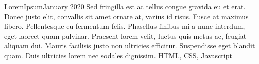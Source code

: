 
\begin{projects}
	\project
	{LoremIpsum}{January 2020}
	{}
	{
		Sed fringilla est ac tellus congue gravida eu et erat. Donec justo elit, convallis sit amet ornare at, varius id risus. Fusce at maximus libero. Pellentesque eu fermentum felis. Phasellus finibus mi a nunc interdum, eget laoreet quam pulvinar. Praesent lorem velit, luctus quis metus ac, feugiat aliquam dui. Mauris facilisis justo non ultricies efficitur. Suspendisse eget blandit quam. Duis ultricies lorem nec sodales dignissim. 
	}{HTML, CSS, Javascript}
\end{projects}